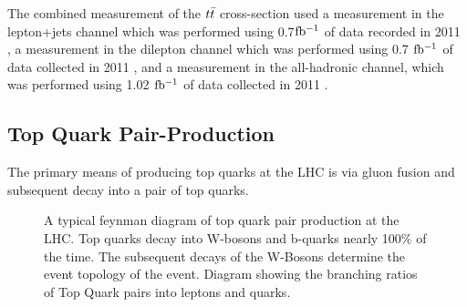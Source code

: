 The combined measurement of the $t\bar{t}$ cross-section used a measurement in the lepton+jets channel which was performed using 0.7$\mbox{fb$^{-1}$}$ of data recorded in 2011 \cite{LEPTON_JETS_NOTE_2011}, a measurement in the dilepton channel which was performed using 0.7 $\mbox{fb$^{-1}$}$ of data collected in 2011 \cite{DILEPTON_PAPER}, and a measurement in the all-hadronic channel, which was performed using 1.02 $\mbox{fb$^{-1}$}$ of data collected in 2011 \cite{ALL_HADRONIC_NOTE}.


\subsection{Top Quark Pair-Production}

The primary means of producing top quarks at the LHC is via gluon fusion and subsequent decay into a pair of top quarks.

\begin{figure}
  \begin{center}

  \end{center}
  \caption{ A typical feynman diagram of top quark pair production at the LHC.  Top quarks decay into W-bosons and b-quarks nearly 100\% of the time.  The subsequent decays of the W-Bosons determine the event topology of the \ttbar event.  Diagram showing the branching ratios of Top Quark pairs into leptons and quarks.}
  \label{img:TopQuarkPairProduction}
\end{figure}

